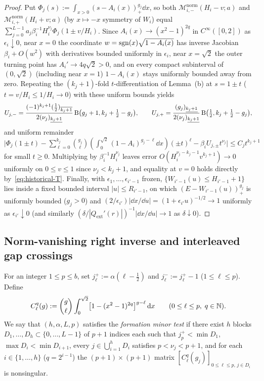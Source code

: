 \begin{proof}
Put $\Phi_j(s):=\int_{x>0}(s-A_i(x))_+^{g_j}\dd x$, so both $\mathcal{M}_{i,-}^{\mathrm{norm}}(H_i-v;a)$ and $\mathcal{M}_{i,+}^{\mathrm{norm}}(H_i+v;a)$ (by $x\mapsto -x$ symmetry of $W_i$) equal $\sum_{j=0}^{L-1} a_j \beta_i^{-1} H_i^{\nu_j}\Phi_j(1\pm v/H_i)$. Since $A_i(x)\to(x^2-1)^{2q}$ in $C^\infty([0,2])$ as $\epsilon_i\downarrow 0$, near $x=0$ the coordinate $w=\operatorname{sgn}(x)\sqrt{1-A_i(x)}$ has inverse Jacobian $\beta_i+O(w^2)$ with derivatives bounded uniformly in $\epsilon_i$, near $x=\sqrt{2}$ the outer turning point has $A_i'\to 4q\sqrt{2}>0$, and on every compact subinterval of $(0,\sqrt{2})$ (including near $x=1$) $1-A_i(x)$ stays uniformly bounded away from zero. Repeating the $(k_j+1)$-fold $t$-differentiation of Lemma~(b) at $s=1\pm t$ ($t=v/H_i\le 1/H_i\to 0$) with these uniform bounds yields
\[
  U_{j,-} = \frac{(-1)^{k_j+1}(\tfrac{1}{2})_{\overline{k_j+1}}}{2(\nu_j)_{\underline{k_j+1}}}\,\mathrm{B}\bigl(g_j+1,k_j+\tfrac{1}{2}-g_j\bigr), \qquad
  U_{j,+} = \frac{(g_j)_{\underline{k_j+1}}}{2(\nu_j)_{\underline{k_j+1}}}\,\mathrm{B}\bigl(\tfrac{1}{2},k_j+\tfrac{1}{2}-g_j\bigr),
\]
and uniform remainder $\bigl|\Phi_j(1\pm t)-\sum_{\ell=0}^{k_j}\binom{g_j}{\ell}(\int_0^{\sqrt{2}}(1-A_i)^{g_j-\ell}\dd x)(\pm t)^\ell - \beta_i U_{j,\pm} t^{\nu_j}\bigr|\le C_j t^{k_j+1}$ for small $t\ge 0$. Multiplying by $\beta_i^{-1}H_i^{\nu_j}$ leaves error $O(H_i^{\nu_j-k_j-1}v^{k_j+1})\to 0$ uniformly on $0\le v\le 1$ since $\nu_j<k_j+1$, and equality at $v=0$ holds directly by~\eqref{eq:historical-T}. Finally, with $\epsilon_1,\dots,\epsilon_{i'-1}$ frozen, $\{W_{i'-1}(u)\le H_{i'-1}+1\}$ lies inside a fixed bounded interval $|u|\le R_{i'-1}$, on which $(E-W_{i'-1}(u))_+^{g_j}$ is uniformly bounded ($g_j>0$) and $(2/\epsilon_{i'})|\dd x/\dd u|=(1+\epsilon_{i'}u)^{-1/2}\to 1$ uniformly as $\epsilon_{i'}\downarrow 0$ (and similarly $(\delta/|Q_{\mathrm{ext}}'(r)|)^{-1}|\dd x/\dd u|\to 1$ as $\delta\downarrow 0$).
\end{proof}

\subsection{Norm-vanishing right inverse and interleaved gap crossings}\label{subsec:schur-right-inv}

For an integer $1\le p\le b$, set $j_\ell^+:=\alpha(\ell-\tfrac{1}{2})$ and $j_\ell^-:=j_\ell^+-1$ ($1\le\ell\le p$). Define
\begin{equation}\label{eq:C-matrix}
  C_\ell^q(g) := \binom{g}{\ell}\int_0^{\sqrt{2}}\bigl[1-(x^2-1)^{2q}\bigr]^{g-\ell}\,\mathrm{d} x \qquad (0\le\ell\le p,\; q\in\mathbb{N}).
\end{equation}
We say that $(h,\alpha,L,p)$ satisfies the \emph{formation minor test} if there exist $h$ blocks $D_1,\dots,D_h\subset\{0,\dots,L-1\}$ of $p+1$ indices each such that $j_p^+<\min D_1$, $\max D_i<\min D_{i+1}$, every $j\in\bigcup_{i=1}^h D_i$ satisfies $p<\nu_j<p+1$, and for each $i\in\{1,\dots,h\}$ ($q=2^{i-1}$) the $(p+1)\times(p+1)$ matrix $[C_\ell^q(g_j)]_{0\le\ell\le p,\,j\in D_i}$ is nonsingular.

